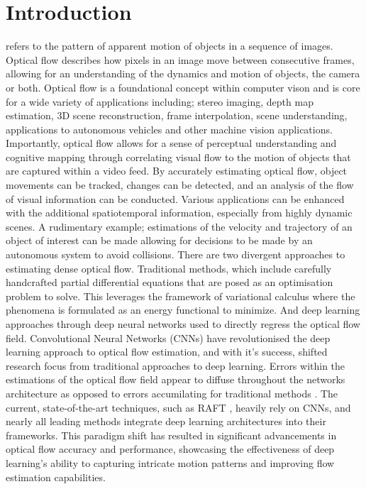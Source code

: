 \section{Introduction}\label{sec:intro}

 refers to the pattern of apparent motion of objects in a sequence of images. Optical flow describes how pixels in an image move between consecutive frames, allowing for an understanding of the dynamics and motion of objects, the camera or both. Optical flow is a foundational concept within computer vison and is core for a wide variety of applications including; stereo imaging, depth map estimation, 3D scene reconstruction, frame interpolation, scene understanding, applications to autonomous vehicles and other machine vision applications.
\IEEEPARstart{}{} Importantly, optical flow allows for a sense of perceptual understanding and cognitive mapping through correlating visual flow to the motion of objects that are captured within a video feed. By accurately estimating optical flow, object movements can be tracked, changes can be detected, and an analysis of the flow of visual information can be conducted. Various applications can be enhanced with the additional spatiotemporal information, especially from highly dynamic scenes. A rudimentary example; estimations of the velocity and trajectory of an object of interest can be made allowing for decisions to be made by an autonomous system to avoid collisions.
\IEEEPARstart{}{} There are two divergent approaches to estimating dense optical flow. Traditional methods, which include carefully handcrafted partial differential equations that are posed as an optimisation problem to solve. This leverages the framework of variational calculus where the phenomena is formulated as an energy functional to minimize. And deep learning approaches through deep neural networks used to directly regress the optical flow field. 
\IEEEPARstart{}{} Convolutional Neural Networks (CNNs) have revolutionised the deep learning approach to optical flow estimation, and with it's success, shifted research focus from traditional approaches to deep learning. Errors within the estimations of the optical flow field appear to diffuse throughout the networks architecture as opposed to errors accumilating for traditional methods \cite{dosovitskiy2015flownet,sun2018pwc}. The current, state-of-the-art techniques, such as RAFT \cite{teed2020raft}, heavily rely on CNNs, and nearly all leading methods integrate deep learning architectures into their frameworks. This paradigm shift has resulted in significant advancements in optical flow accuracy and performance, showcasing the effectiveness of deep learning's ability to capturing intricate motion patterns and improving flow estimation capabilities. 
